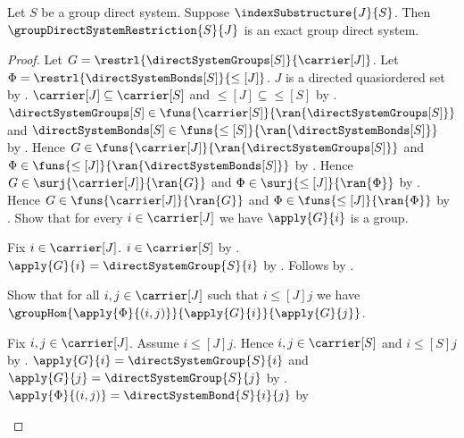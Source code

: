 \begin{theorem}\label{group_direct_system_restriction_is_exact}
    Let $S$ be a group direct system.
    Suppose $\indexSubstructure{J}{S}$.
    Then $\groupDirectSystemRestriction{S}{J}$ is an exact
        group direct system.
\end{theorem}
\begin{proof}
    Let $G=\restrl{\directSystemGroups[S]}{\carrier[J]}$.
    Let $\Phi=\restrl{\directSystemBonds[S]}{\leq[J]}$.
    $J$ is a directed quasiordered set by
        .
    $\carrier[J]\subseteq\carrier[S]$ and
        $\leq[J]\subseteq\leq[S]$ by
        .
    $\directSystemGroups[S]\in
        \funs{\carrier[S]}{\ran{\directSystemGroups[S]}}$ and
        $\directSystemBonds[S]\in
        \funs{\leq[S]}{\ran{\directSystemBonds[S]}}$ by
        .
    Hence $G\in\funs{\carrier[J]}{\ran{\directSystemGroups[S]}}$ and
        $\Phi\in\funs{\leq[J]}{\ran{\directSystemBonds[S]}}$ by
        .
    Hence $G\in\surj{\carrier[J]}{\ran{G}}$ and
        $\Phi\in\surj{\leq[J]}{\ran{\Phi}}$ by
        .
    Hence $G\in\funs{\carrier[J]}{\ran{G}}$ and
        $\Phi\in\funs{\leq[J]}{\ran{\Phi}}$ by
        .
    Show that for every $i\in\carrier[J]$ we have $\apply{G}{i}$ is a group.
    \begin{subproof}
        Fix $i\in\carrier[J]$.
        $i\in\carrier[S]$ by .
        $\apply{G}{i}=\directSystemGroup{S}{i}$ by
            .
        Follows by .
    \end{subproof}
    Show that for all $i,j\in\carrier[J]$ such that
        $i\mathrel{\leq[J]}j$ we have
        $\groupHom{\apply{\Phi}{(i,j)}}
            {\apply{G}{i}}{\apply{G}{j}}$.
    \begin{subproof}
        Fix $i,j\in\carrier[J]$.
        Assume $i\mathrel{\leq[J]}j$.
        Hence $i,j\in\carrier[S]$ and
            $i\mathrel{\leq[S]}j$ by
            .
        $\apply{G}{i}=\directSystemGroup{S}{i}$ and
            $\apply{G}{j}=\directSystemGroup{S}{j}$ by
            .
        $\apply{\Phi}{(i,j)}=\directSystemBond{S}{i}{j}$ by

\end{subproof}
\end{proof}
